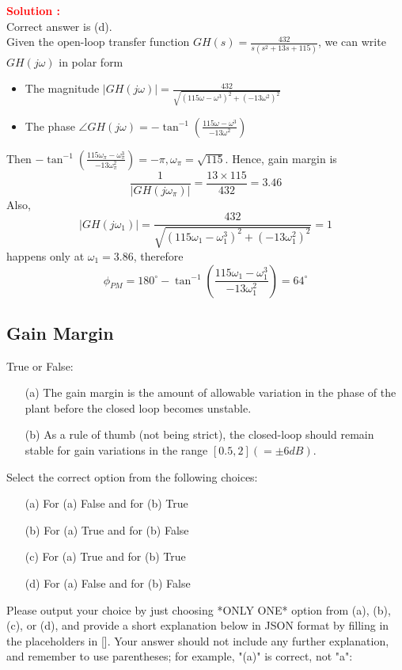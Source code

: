 \documentclass[12pt]{article}
\begin{document}
\textbf{\textcolor{red}{Solution :}} \\
Correct answer is (d).\\
Given the open-loop transfer function \(GH(s) = \frac{432}{s(s^2 + 13s + 115)}\), we can write $GH(j\omega)$ in polar form
\begin{itemize}
    \item The magnitude $|GH(j\omega)| = \frac{432}{\sqrt{(115\omega-\omega^3)^2+(-13\omega^2)^2}}$
    \item The phase $\angle GH(j\omega) = - \tan^{-1}(\frac{115\omega - \omega^3}{-13\omega^2})$
\end{itemize}
Then \(- \tan^{-1}(\frac{115\omega_\pi - \omega_\pi^3}{-13\omega_\pi^2}) = -\pi, \omega_\pi =  \sqrt{115}\). Hence, gain margin is
\[ \frac{1}{|GH(j\omega_\pi)|} = \frac{13\times 115}{432} = 3.46\]
Also,
\[|GH(j\omega_1)| = \frac{432}{\sqrt{(115\omega_1-\omega_1^3)^2+(-13\omega_1^2)^2}} = 1\]
happens only at \(\omega_1  = 3.86\), therefore
\[\phi_{PM} = 180^\circ  - \tan^{-1}\left(\frac{115\omega_1 - \omega_1^3}{-13\omega_1^2}\right) = 64^\circ \]
\clearpage

\subsection{Gain Margin}

True or False:
\begin{itemize}
    \item[(a)] The gain margin is the amount of allowable variation in the phase of the plant before the closed loop becomes unstable.
    \item[(b)] As a rule of thumb (not being strict), the closed-loop should remain stable for gain variations in the range $[0.5, 2] (= ±6dB)$. 
    \end{itemize}

Select the correct option from the following choices:
\begin{enumerate}
    \item [(a)] For (a) False and for (b) True
    \item [(b)] For (a) True and for (b) False
    \item [(c)] For (a) True and for (b) True 
    \item [(d)] For (a) False and for (b) False
\end{enumerate}

Please output your choice by just choosing *ONLY ONE* option from (a), (b), (c), or (d), and provide a short explanation below in JSON format by filling in the placeholders in []. Your answer should not include any further explanation, and remember to use parentheses; for example, "(a)" is correct, not "a": 
\end{document}
